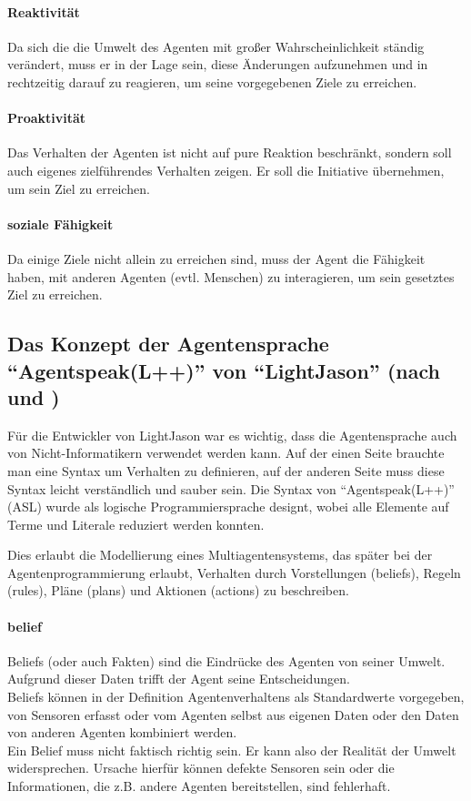 \paragraph*{Reaktivität} 
Da sich die die Umwelt des Agenten  mit großer Wahrscheinlichkeit ständig verändert, muss er in der Lage sein, diese Änderungen aufzunehmen und in rechtzeitig darauf zu reagieren, um seine vorgegebenen Ziele zu erreichen.

\paragraph*{Proaktivität} 
Das Verhalten der Agenten ist nicht auf pure Reaktion beschränkt, sondern soll auch eigenes zielführendes Verhalten zeigen. 
Er soll die Initiative übernehmen, um sein Ziel zu erreichen.

\paragraph*{soziale Fähigkeit} 
Da einige Ziele nicht allein zu erreichen sind, muss der Agent die Fähigkeit haben, mit anderen Agenten (evtl. Menschen) zu interagieren, um sein gesetztes Ziel zu erreichen.


\subsection{Das Konzept der Agentensprache \enquote{Agentspeak(L++)} von \enquote{LightJason} (nach \cite{lightjason} und \cite{lightjason-web})}
\label{sec:agentspeak}

Für die Entwickler von LightJason war es wichtig, dass die Agentensprache auch von Nicht-Informatikern verwendet werden kann.
Auf der einen Seite brauchte man eine Syntax um Verhalten zu definieren, auf der anderen Seite muss diese Syntax leicht verständlich und sauber sein.
Die Syntax von \enquote{Agentspeak(L++)} (ASL) wurde als logische Programmiersprache designt, wobei alle Elemente auf Terme und Literale reduziert werden konnten.

Dies erlaubt die Modellierung eines Multiagentensystems, das später bei der Agentenprogrammierung erlaubt, Verhalten durch Vorstellungen (beliefs), Regeln (rules), Pläne (plans) und Aktionen (actions) zu beschreiben.

\paragraph*{belief}
Beliefs (oder auch Fakten) sind die Eindrücke des Agenten von seiner Umwelt.
Aufgrund dieser Daten trifft der Agent seine Entscheidungen.
\\
Beliefs können in der Definition Agentenverhaltens als Standardwerte vorgegeben, von Sensoren erfasst oder vom Agenten selbst aus eigenen Daten oder den Daten von anderen Agenten kombiniert werden.
\\
Ein Belief muss nicht faktisch richtig sein.
Er kann also der Realität der Umwelt widersprechen. 
Ursache hierfür können defekte Sensoren sein oder die Informationen, die z.B. andere Agenten bereitstellen, sind fehlerhaft.

